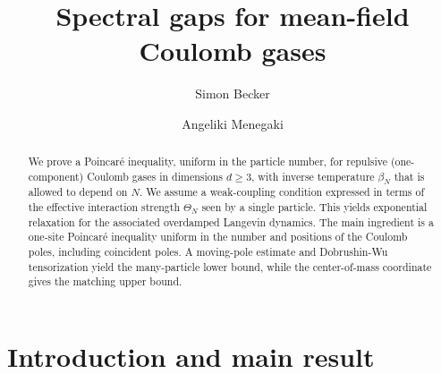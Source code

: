 \documentclass[12pt,reqno,letterpaper]{amsart}
\title[Spectral gaps for Coulomb gases]
{Spectral gaps for mean-field Coulomb gases}
\author{Simon Becker}
\author{Angeliki Menegaki}
\theoremstyle{definition}
\theoremstyle{remark}
\numberwithin{equation}{section}
\newcommand{\be}{\beta}
\newcommand{\al}{\alpha}
\begin{document}
\begin{abstract}
We prove a Poincar\'e inequality, uniform in the particle number, for repulsive (one-component) Coulomb gases in dimensions \(d\ge3\), with inverse temperature \(\be_N\) that is allowed to depend on \(N\). We assume a weak-coupling condition expressed in terms of the effective interaction strength \(\Theta_N\) seen by a single particle. This yields exponential relaxation for the associated overdamped Langevin dynamics.  
The main ingredient is a one-site Poincar\'e inequality
uniform in the number and positions of the Coulomb poles, including coincident
poles. A moving-pole estimate and Dobrushin-Wu tensorization yield the
many-particle lower bound, while the center-of-mass coordinate gives the matching upper bound.
\end{abstract}


\maketitle

\section{Introduction and main result}
\end{document}
